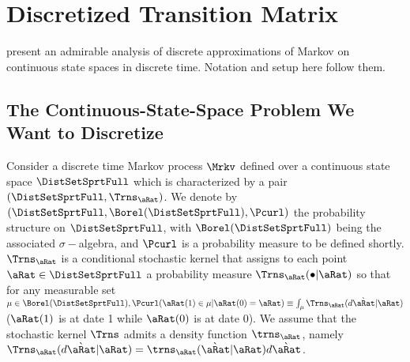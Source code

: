 \documentclass[../BufferStockTheory.tex]{subfiles}\usepackage{ApndxSteadyState}
\begin{document}
  \section{Discretized Transition Matrix}

  \cite{eaDiscretize} present an admirable analysis of discrete approximations of Markov on continuous state spaces in discrete time.  Notation and setup here follow them.

  \subsection{The Continuous-State-Space Problem We Want to Discretize} 
  Consider a discrete time Markov process $\Mrkv$ defined over a continuous state space $\DistSetSprtFull$ which is characterized by a pair $(\DistSetSprtFull,\Trns_{\point})$.   We denote by $(\DistSetSprtFull,\Borel(\DistSetSprtFull),\Pcurl)$ the probability structure on $\DistSetSprtFull$, with $\Borel(\DistSetSprtFull)$ being the associated $\sigma-$algebra, and $\Pcurl$ is a probability measure to be defined shortly. $\Trns_{\point}$ is a conditional stochastic kernel  that assigns to each point $\point \in \DistSetSprtFull$ a probability measure $\Trns_{\point}(\bullet|\point)$ so that for any measurable set $\SetSub \in \Borel(\DistSetSprtFull), \Pcurl(\point(1) \in \SetSub|\point(0)=\point) \equiv \int_{\SetSub}\Trns_{\point}(d\Nxt{\point}|\point)$ ($\point(1)$ is at date 1 while $\point(0)$ is at date 0).  We assume that the stochastic kernel $\Trns$ admits a density function $\trns_{\point}$, namely $\Trns_{\point}(d\Nxt{\point}|\point) = \trns_{\point}(\Nxt{\point}|\point)d\Nxt{\point}$.
\end{document}
